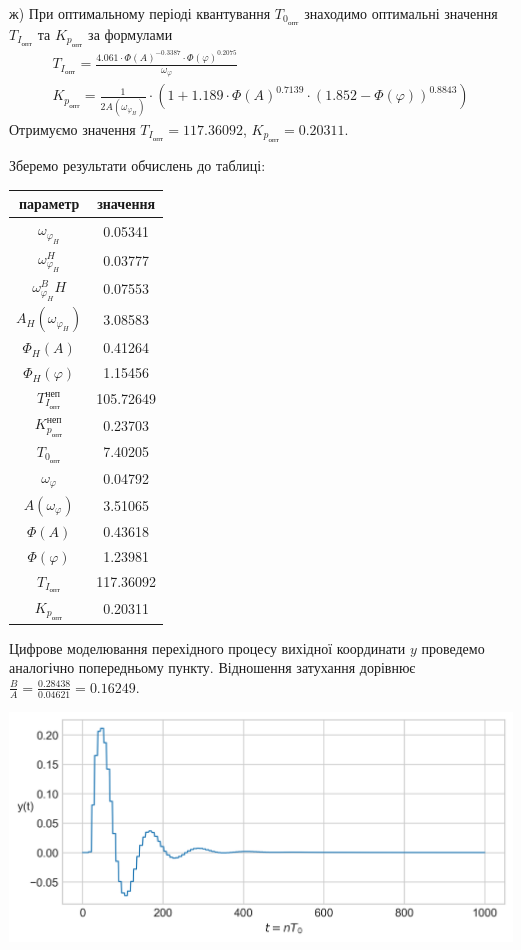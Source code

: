 ж)\; При оптимальному періоді квантування $T_{0_{\text{опт}}}$ знаходимо 
оптимальні значення $T_{I_{\text{опт}}}$ та $K_{p_{\text{опт}}}$ за формулами
\begin{gather}
    T_{I_{\text{опт}}} = 
    \frac{4.061 \cdot \Phi(A)^{-0.3387} \cdot \Phi(\varphi)^{0.2075}}{\omega_{\varphi}} \\
    K_{p_{\text{опт}}} = \frac{1}{2 A\left(\omega_{\varphi_H}\right)}
    \cdot \left(
        1 + 1.189 \cdot \Phi(A)^{0.7139}\cdot \left(1.852 - \Phi(\varphi)\right)^{0.8843}
    \right)
\end{gather}
Отримуємо значення
$T_{I_{\text{опт}}} = 117.36092$, $K_{p_{\text{опт}}} = 0.20311$.

Зберемо результати обчислень до таблиці:
\begin{center}
    \begin{tabular}{|c|c|}
        \hline
        параметр & значення \\
        \hline
        $\omega_{\varphi_H}$ & 0.05341\\
        \hline
        $\omega_{\varphi_H}^H$ & 0.03777\\
        \hline
        $\omega_{\varphi_H}^BH$ & 0.07553\\
        \hline
        $A_H\left(\omega_{\varphi_H}\right)$ & 3.08583\\
        \hline
        $\Phi_H(A)$ & 0.41264\\
        \hline
        $\Phi_H(\varphi)$ & 1.15456\\
        \hline
        $T_{I_{\text{опт}}}^{\text{неп}}$ & 105.72649\\
        \hline
        $K_{p_{\text{опт}}}^{\text{неп}}$ & 0.23703\\
        \hline
        $T_{0_{\text{опт}}}$ & 7.40205\\
        \hline
        $\omega_{\varphi}$ & 0.04792\\
        \hline
        $A\left(\omega_{\varphi}\right)$ & 3.51065\\
        \hline
        $\Phi(A)$ & 0.43618\\
        \hline
        $\Phi(\varphi)$ & 1.23981\\
        \hline
        $T_{I_{\text{опт}}}$ & 117.36092\\
        \hline
        $K_{p_{\text{опт}}}$ & 0.20311\\
        \hline
     \end{tabular}
\end{center}

Цифрове моделювання перехідного процесу вихідної координати $y$ проведемо аналогічно попередньому пункту. 
Відношення затухання дорівнює 
$\frac{B}{A} = \frac{0.28438}{0.04621} = 0.16249$.
\begin{center}
    \includegraphics[scale=0.9]{pics/transient_process_task_5_2.png}
\end{center}